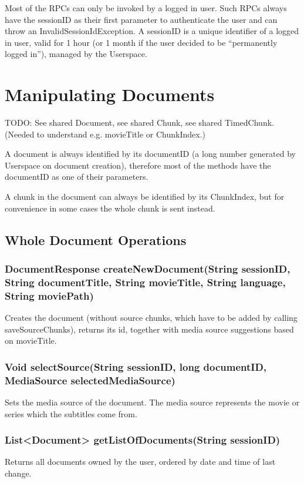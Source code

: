 Most of the RPCs can only be invoked by a logged in user. Such RPCs always have the sessionID as their first parameter to authenticate the user and can throw an InvalidSessionIdException.
A sessionID is a unique identifier of a logged in user, valid for 1 hour (or 1 month if the user decided to be ``permanently logged in''), managed by the Userspace.

\section{Manipulating Documents}

TODO: See shared Document, see shared Chunk, see shared TimedChunk.
(Needed to understand e.g. movieTitle or ChunkIndex.)

A document is always identified by its documentID (a long number generated by Userspace on document creation), therefore most of the methods have the documentID as one of their parameters.

A chunk in the document can always be identified by its ChunkIndex, but for convenience in some cases the whole chunk is sent instead.

\subsection{Whole Document Operations}

\subsubsection{DocumentResponse createNewDocument(String sessionID, String documentTitle, String movieTitle, String language, String moviePath)}

Creates the document
(without source chunks, which have to be added by calling saveSourceChunks),
returns its id, together with media source suggestions based on movieTitle.
     	
\subsubsection{Void selectSource(String sessionID, long documentID, MediaSource selectedMediaSource)}
Sets the media source of the document. The media source represents the movie or series which the subtitles come from.

\subsubsection{List<Document> getListOfDocuments(String sessionID)}
Returns all documents owned by the user, ordered by date and time of last change.

